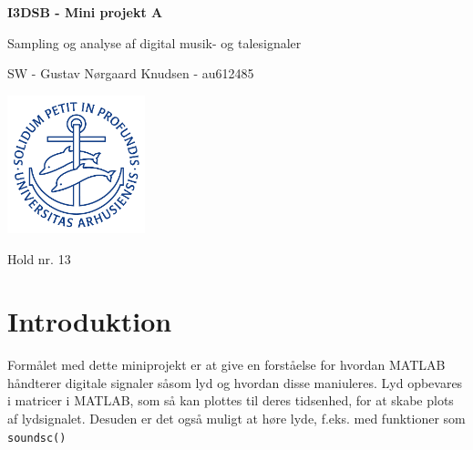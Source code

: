 \documentclass{article}
\begin{document}

\begin{titlepage}
    
  \begin{center}
    \vspace*{1cm}

    \Huge
    \textbf{I3DSB - Mini projekt A}

    \vspace{0.5cm}
    \huge
    Sampling og analyse af digital musik- og talesignaler \\
    \date\today

    \vspace{3cm}

    \Large
    SW - Gustav Nørgaard Knudsen - au612485 

    
    
    \vfill
    \includegraphics[width=0.3\textwidth]{au2}
    \vspace{2cm}

    Hold nr. 13

  \end{center}
\end{titlepage}

\newpage
\newpage

\setcounter{page}{1}


\section{Introduktion}
Formålet med dette miniprojekt er at give en forståelse for hvordan MATLAB håndterer digitale signaler såsom lyd og hvordan disse maniuleres. Lyd opbevares i matricer i MATLAB, som så kan plottes til deres tidsenhed, for at skabe plots af lydsignalet. Desuden er det også muligt at høre lyde, f.eks. med funktioner som \lstinline{soundsc()}
\end{document}

